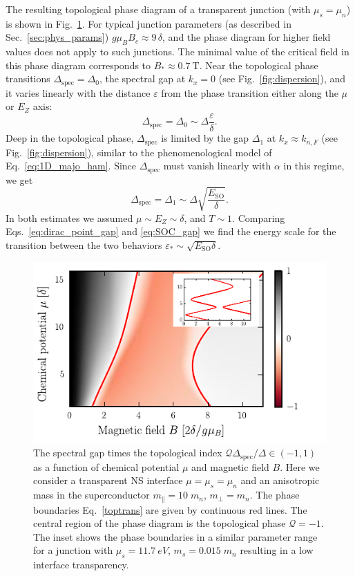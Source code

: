 The resulting topological phase diagram of a transparent junction (with $\mu_s = \mu_n$) is shown in Fig.~\ref{fig:gaps}.
For typical junction parameters (as described in Sec.~\ref{sec:phys_params}) $g\mu_B B_c \approx 9\,\delta$, and the phase diagram for higher field values does not apply to such junctions.
The minimal value of the critical field in this phase diagram corresponds to $B_*\approx \SI{0.7}{\tesla}$.
Near the topological phase transitions $\Delta_\textrm{spec} = \Delta_0$, the spectral gap at $k_x=0$ (see Fig.~\ref{fig:dispersion}), and it varies linearly with the distance $\varepsilon$ from the phase transition either along the $\mu$ or $E_Z$ axis:
\begin{equation}
  \label{eq:dirac_point_gap}
  \Delta_\textrm{spec} = \Delta_0 \sim \Delta \frac{\varepsilon}{\delta}.
\end{equation}
Deep in the topological phase, $\Delta_\textrm{spec}$ is limited by the gap $\Delta_1$ at $k_x \approx k_{n,F}$ (see Fig.~\ref{fig:dispersion}), similar to the phenomenological model of Eq.~\eqref{eq:1D_majo_ham}.
Since $\Delta_\textrm{spec}$ must vanish linearly with $\alpha$ in this regime, we get
\begin{equation}
  \label{eq:SOC_gap}
  \Delta_\textrm{spec} = \Delta_1 \sim \Delta \sqrt{\frac{E_{\textrm{SO}}}{\delta}}.
\end{equation}
In both estimates we assumed $\mu \sim E_Z \sim \delta$, and $T\sim 1$.
Comparing Eqs.~\eqref{eq:dirac_point_gap} and \eqref{eq:SOC_gap} we find the energy scale for the transition between the two behaviors $\varepsilon_* \sim \sqrt{E_\textrm{SO} \delta}$.

\begin{figure}
\begin{center}
\includegraphics[width=0.7\columnwidth]{chapter_shortjunction/figures/gaps}
\caption{The spectral gap times the topological index $\mathcal Q \Delta_\mathrm{spec} /\Delta \in(-1,1)$ as a function of chemical potential $\mu$ and magnetic field $B$.
Here we consider a transparent NS interface $\mu=\mu_s=\mu_n$ and an anisotropic mass in the superconductor $m_\parallel=10\;m_n$, $m_\perp = m_n$.
The phase boundaries Eq.~\eqref{toptrans} are given by continuous red lines.
The central region of the phase diagram is the topological phase $\mathcal Q=-1$.
The inset shows the phase boundaries in a similar parameter range for a junction with $\mu_s=\SI{11.7}{eV}$, $m_s=0.015\;m_n$ resulting in a low interface transparency.
}
\label{fig:gaps}
\end{center}
\end{figure}

